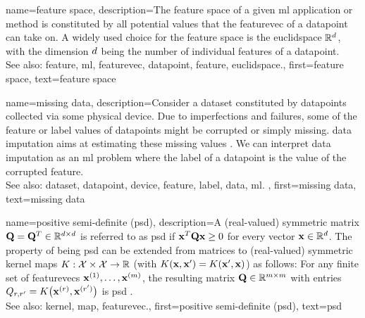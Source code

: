 {name={feature space},
	description={The \gls{feature} space of a given \gls{ml} application or method is 
		constituted by all potential values that the \gls{featurevec} of a \gls{datapoint} can 
		take on. A widely used choice for the \gls{feature} space is the \gls{euclidspace} $\mathbb{R}^{d}$, 
		with the dimension $d$ being the number of individual \glspl{feature} of a \gls{datapoint}.
				\\
		See also: \gls{feature}, \gls{ml}, \gls{featurevec}, \gls{datapoint}, \gls{feature}, \gls{euclidspace}.},
	first={feature space},
	text={feature space}  
}


{name={missing data},
	description={Consider a \gls{dataset} constituted by \glspl{datapoint} collected via 
		some physical \gls{device}. Due to imperfections and failures, some of the \gls{feature} 
		or \gls{label} values of \glspl{datapoint} might be corrupted or simply missing. 
		\Gls{data} imputation aims at estimating these missing values \cite{Abayomi2008DiagnosticsFM}. 
		We can interpret \gls{data} imputation as an \gls{ml} problem where the \gls{label} of a \gls{datapoint} is 
		the value of the corrupted \gls{feature}.
				\\
		See also: \gls{dataset}, \gls{datapoint}, \gls{device}, \gls{feature}, \gls{label}, \gls{data}, \gls{ml}. },
	first={missing data},
	text={missing data}  
}


{name={positive semi-definite (psd)},
	description={A (real-valued) symmetric matrix $\mathbf{Q} = \mathbf{Q}^{T} \in \mathbb{R}^{d \times d}$ 
	 	is referred to as psd if ${\bf x}^{T} \mathbf{Q} {\bf x} \geq 0$ for every vector ${\bf x} \in \mathbb{R}^{d}$. 
	 	The property of being psd can be extended from matrices to (real-valued) 
	 	symmetric \gls{kernel} \glspl{map} $K: \mathcal{X} \times \mathcal{X} \rightarrow \mathbb{R}$ 
	 	(with $K({\bf x},{\bf x}') = K({\bf x}',{\bf x})$)
	 	as follows: For any finite set of \glspl{featurevec} ${\bf x}^{(1)},\dots,{\bf x}^{(m)}$, 
	 	the resulting matrix $\mathbf{Q} \in \mathbb{R}^{m \times m}$ with 
		entries $Q_{r,r'} = K\big({\bf x}^{(r)},{\bf x}^{(r')}\big)$ 
		is psd \cite{LearningKernelsBook}.
			\\
		See also: \gls{kernel}, \gls{map}, \gls{featurevec}.},
	first={positive semi-definite (psd)},
	text={psd}  
}

